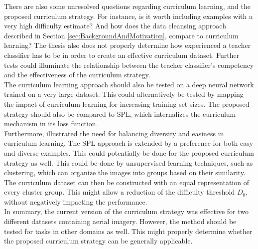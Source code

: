 There are also some unresolved questions regarding curriculum learning, and the proposed curriculum strategy. For instance, is it worth including examples with a very high difficulty estimate? And how does the data cleansing approach described in Section \ref{sec:BackgroundAndMotivation}, compare to curriculum learning? The thesis also does not properly determine how experienced a teacher classifier has to be in order to create an effective curriculum dataset. Further tests could illuminate the relationship between the teacher classifier's competency and the effectiveness of the curriculum strategy.  \\

The curriculum learning approach should also be tested on a deep neural network trained on a very large dataset. This could alternatively be tested by mapping the impact of curriculum learning for increasing training set sizes. The proposed strategy should also be compared to \ac{SPL}\citep{Kumar_self_paced_learning}, which internalizes the curriculum mechanism in its loss function.\\

Furthermore, \cite{Lu_self-paced_learning_diversity} illustrated the need for balancing diversity and easiness in curriculum learning. The \ac{SPL} approach is extended by a preference for both easy and diverse examples. This could potentially be done for the proposed curriculum strategy as well. This could be done by unsupervised learning techniques, such as clustering, which can organize the images into groups based on their similarity. The curriculum dataset can then be constructed with an equal representation of every cluster group. This might allow a reduction of the difficulty threshold $D_0$, without negatively impacting the performance.\\

In summary, the current version of the curriculum strategy was effective for two different datasets containing aerial imagery. However, the method should be tested for tasks in other domains as well. This might properly determine whether the proposed curriculum strategy can be generally applicable.\\
 

